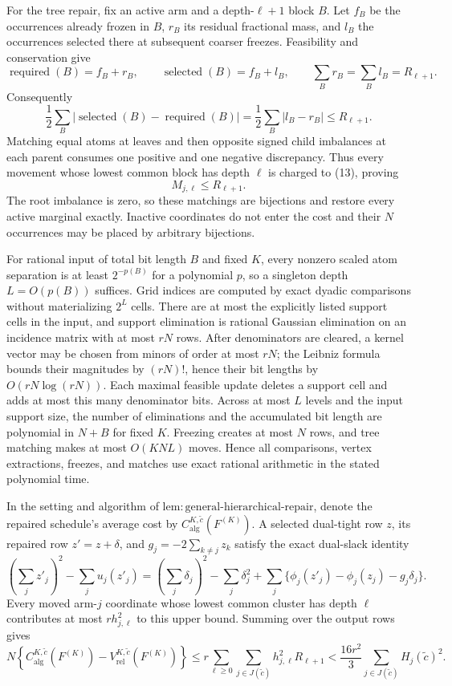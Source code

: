 For the tree repair, fix an active arm and a depth-\(\ell+1\) block \(B\).  Let \(f_B\) be the occurrences already frozen in \(B\), \(r_B\) its residual fractional mass, and \(l_B\) the occurrences selected there at subsequent coarser freezes.  Feasibility and conservation give
\[
 \operatorname{required}(B)=f_B+r_B,\qquad
 \operatorname{selected}(B)=f_B+l_B,\qquad
 \sum_Br_B=\sum_Bl_B=R_{\ell+1}. \tag{12}
\]
Consequently
\[
 \frac12\sum_B|\operatorname{selected}(B)-\operatorname{required}(B)|
 =\frac12\sum_B|l_B-r_B|\le R_{\ell+1}. \tag{13}
\]
Matching equal atoms at leaves and then opposite signed child imbalances at each parent consumes one positive and one negative discrepancy.  Thus every movement whose lowest common block has depth \(\ell\) is charged to (13), proving
\[
 M_{j,\ell}\le R_{\ell+1}. \tag{14}
\]
The root imbalance is zero, so these matchings are bijections and restore every active marginal exactly.  Inactive coordinates do not enter the cost and their \(N\) occurrences may be placed by arbitrary bijections.

For rational input of total bit length \(B\) and fixed \(K\), every nonzero scaled atom separation is at least \(2^{-p(B)}\) for a polynomial \(p\), so a singleton depth \(L=O(p(B))\) suffices.  Grid indices are computed by exact dyadic comparisons without materializing \(2^L\) cells.  There are at most the explicitly listed support cells in the input, and support elimination is rational Gaussian elimination on an incidence matrix with at most \(rN\) rows.  After denominators are cleared, a kernel vector may be chosen from minors of order at most \(rN\); the Leibniz formula bounds their magnitudes by \((rN)!\), hence their bit lengths by \(O(rN\log(rN))\).  Each maximal feasible update deletes a support cell and adds at most this many denominator bits.  Across at most \(L\) levels and the input support size, the number of eliminations and the accumulated bit length are polynomial in \(N+B\) for fixed \(K\).  Freezing creates at most \(N\) rows, and tree matching makes at most \(O(KNL)\) moves.  Hence all comparisons, vertex extractions, freezes, and matches use exact rational arithmetic in the stated polynomial time.

In the setting and algorithm of \(\mathrm{lem{:}general\mbox{-}hierarchical\mbox{-}repair}\), denote the repaired schedule's average cost by \(C_{\mathrm{alg}}^{K,\widetilde c}(F^{(K)})\).  A selected dual-tight row \(z\), its repaired row \(z'=z+\delta\), and \(g_j=-2\sum_{k\ne j}z_k\) satisfy the exact dual-slack identity
\[
 \left(\sum_jz'_j\right)^2-\sum_ju_j(z'_j)
 =\left(\sum_j\delta_j\right)^2-\sum_j\delta_j^2
 +\sum_j\{\phi_j(z'_j)-\phi_j(z_j)-g_j\delta_j\}.
\]
Every moved arm-\(j\) coordinate whose lowest common cluster has depth \(\ell\) contributes at most \(r h_{j,\ell}^2\) to this upper bound.  Summing over the output rows gives
\[
 N\left\{C_{\mathrm{alg}}^{K,\widetilde c}(F^{(K)})-
 V_{\mathrm{rel}}^{K,\widetilde c}(F^{(K)})\right\}
 \le r\sum_{\ell\ge0}\sum_{j\in J(\widetilde c)}h_{j,\ell}^2R_{\ell+1}
 <\frac{16r^2}{3}\sum_{j\in J(\widetilde c)}H_j(\widetilde c)^2.
\]

